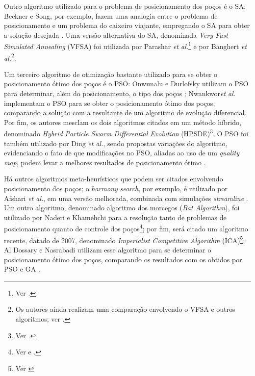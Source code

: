 Outro algoritmo utilizado para o problema de posicionamento dos po\c{c}os \'{e} o SA; Beckner e Song, por exemplo, fazem uma analogia entre o problema de posicionamento e um problema do caixeiro viajante, empregando o SA para obter a solu\c{c}\~{a}o desejada \cite{beckner}. Uma vers\~{a}o alternativa do SA, denominada \textit{Very Fast Simulated Annealing} (VFSA) foi utilizada por Parashar \textit{et al.}\footnote{Ver \cite{parashar}.} e por Banghert \textit{et al.}\footnote{Os autores ainda realizam uma compara\c{c}\~{a}o envolvendo o VFSA e outros algoritmos; ver \cite{Bangerth2006}.}.

Um terceiro algoritmo de otimiza\c{c}\~{a}o bastante utilizado para se obter o posicionamento \'{o}timo dos po\c{c}os \'{e} o PSO: Onwunalu e Durlofsky utilizam o PSO para determinar, al\'{e}m do posicionamento, o tipo dos po\c{c}os \cite{Onwunalu2010}; Nwankwor\textit{et al.} implementam o PSO para se obter o posicionamento \'{o}timo dos po\c{c}os, comparando a solu\c{c}\~{a}o com a resultante de um algoritmo de evolu\c{c}\~{a}o diferencial. Por fim, os autores mesclam os dois algoritmos citados em um m\'{e}todo h\'{i}brido, denominado \textit{Hybrid Particle Swarm Differential Evolution} (HPSDE)\footnote{Ver \cite{Nwankwor2013}.}. O PSO foi tamb\'{e}m utilizado por Ding \textit{et al.}, sendo propostas varia\c{c}\~{o}es do algoritmo, evidenciando o fato de que modifica\c{c}\~{o}es no PSO, aliadas ao uso de um \textit{quality map}, podem levar a melhores resultados de posicionamento \'{o}timo \cite{Ding2014}.

H\'{a} outros algoritmos meta-heur\'{i}sticos que podem ser citados envolvendo posicionamento dos po\c{c}os; o \textit{harmony search}, por exemplo, \'{e} utilizado por Afshari \textit{et al.}, em uma vers\~{a}o melhorada, combinada com simula\c{c}\~{o}es \textit{streamline} \cite{AFSHARI2011664}. Um outro algoritmo, denominado algoritmo dos morcegos (\textit{Bat Algorithm}), foi utilizado por Naderi e Khamehchi para a resolu\c{c}\~{a}o tanto de problemas de posicionamento quanto de controle dos po\c{c}os\footnote{Ver \cite{NADERI2017348} e \cite{NADERI201747}.}; por fim, ser\'{a} citado um algoritmo recente, datado de 2007, denominado \textit{Imperialist Competitive Algorithm} (ICA)\footnote{Ver \cite{ICAdef}}; Al Dossary e Nasrabadi utilizam esse algoritmo para se determinar o posicionamento \'{o}timo dos po\c{c}os, comparando os resultados com os obtidos por PSO e GA \cite{ALDOSSARY2016237}.